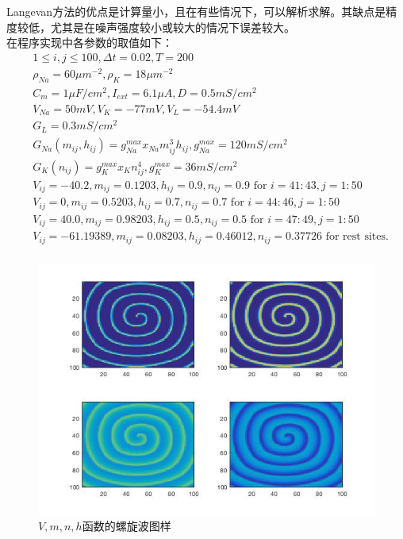 \documentclass[
    bachelor,
    nofont, %
    pdflinks,
    ]{xjtuthesis}
\begin{document}
Langevan方法的优点是计算量小，且在有些情况下，可以解析求解。其缺点是精度较低，尤其是在噪声强度较小或较大的情况下误差较大。\\

在程序实现中各参数的取值如下：
\begin{align*}
& 1 \le i,j \le 100, \Delta t=0.02, T=200 \\
& \rho_{Na}=60 \mu m^{-2},  \rho_{K}=18 \mu m^{-2}\\
& C_m=1 \mu F/cm^{2}, I_{ext}=6.1 \mu A, D =0.5 mS/cm^2\\
& V_{Na}=50mV, V_K=-77mV, V_L=-54.4mV\\
& G_L=0.3mS/cm^2\\
& G_{Na}(m_{ij},h_{ij})=g^{max}_{Na}x_{Na}m^3_{ij}h_{ij}, g^{max}_{Na}=120mS/cm^2\\
& G_{K}(n_{ij})=g^{max}_{K}x_{K}n^4_{ij}, g^{max}_{K}=36mS/cm^2\\
& V_{ij}=-40.2, m_{ij}=0.1203, h_{ij}=0.9, n_{ij}=0.9 \text{ for } i=41:43, j=1:50\\
& V_{ij}=0, m_{ij}=0.5203, h_{ij}=0.7, n_{ij}=0.7 \text{ for } i=44:46, j=1:50\\
& V_{ij}=40.0, m_{ij}=0.98203, h_{ij}=0.5, n_{ij}=0.5 \text{ for } i=47:49, j=1:50\\
& V_{ij}=-61.19389, m_{ij}=0.08203, h_{ij}=0.46012, n_{ij}=0.37726 \text{ for rest sites.}\\
\end{align*}

\clearpage

\begin{figure}[!ht]
\centering
\includegraphics[scale=0.68]{xin_1.jpg}
\caption{$V,m,n,h$函数的螺旋波图样}
\end{figure}
\end{document}
